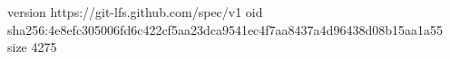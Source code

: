 version https://git-lfs.github.com/spec/v1
oid sha256:4e8efc305006fd6c422cf5aa23dca9541ec4f7aa8437a4d96438d08b15aa1a55
size 4275
